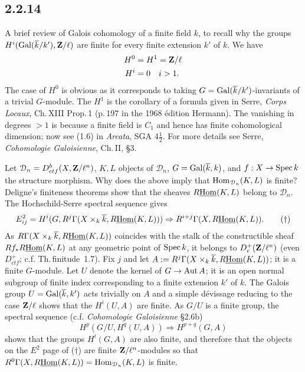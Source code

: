 \documentclass[deligne.tex]{subfiles}
\begin{document}
	\subsection*{2.2.14} A brief review of Galois cohomology of a finite
	field $k$, to recall why the groups $H^i(\operatorname{Gal}(\overline k/k'),\mathbf{Z}/\ell)$
	are finite for every finite extension $k'$ of $k$. We have
	\begin{align*}
		H^0&=H^1=\mathbf{Z}/\ell \\
		H^i&=0\quad i>1.
	\end{align*}
	The case of $H^0$ is obvious as it corresponds to taking
	$G=\operatorname{Gal}(\overline k/k')$-invariants of a trivial
	$G$-module. The $H^1$ is the corollary of a formula given in Serre,
	\emph{Corps Locaux}, Ch.\,XIII Prop.\,1 (p.\,197 in the 1968 édition Hermann).
	The vanishing in
	degrees $>1$ is because a finite field is $C_1$ and hence has finite
	cohomological dimension; now see (1.6) in
	\emph{Arcata}, SGA 4$\frac12$. For more details see Serre,
	\emph{Cohomologie Galoisienne}, Ch.\,II, \S3.
	
	Let $\mathcal D_n= D_{ctf}^b(X,\mathbf{Z}/\ell^n)$,
	$K,L$ objects of $\mathcal D_n$, $G=\operatorname{Gal}(\overline k,k)$,
	and $f:X\rightarrow\operatorname{Spec} k$ the structure morphism.
	Why does the above imply that $\operatorname{Hom}_{\mathcal D_n}(K,L)$ is finite?
	Deligne's finiteness theorems show that the sheaves
	$R\underline{\operatorname{Hom}}(K,L)$ belong to $\mathcal D_n$.
	The Hochschild-Serre spectral sequence gives
	\begin{equation*}
		E^2_{ij}=H^i(G,R^j\Gamma(X\times_k\overline k,R\underline{\operatorname{Hom}}(K,L)))\Rightarrow R^{i+j}\Gamma(X,R\underline{\operatorname{Hom}}(K,L)).\tag{$\dagger$}
	\end{equation*}
	As $R\Gamma(X\times_k\overline k,R\underline{\operatorname{Hom}}(K,L))$ coincides with
	the stalk of the constructible sheaf $Rf_*R\underline{\operatorname{Hom}}(K,L)$
	at any geometric point of $\operatorname{Spec} k$, it belongs to $D^+_{c}(\mathbf{Z}/\ell^n)$
	(even $D^+_{ctf}$; c.f. Th.\,finitude~1.7).
	Fix $j$ and let
	$A:=R^j\Gamma(X\times_k\overline k,R\underline{\operatorname{Hom}}(K,L))$; it is a finite
	$G$-module. Let $U$ denote the kernel of $G\rightarrow\operatorname{Aut} A$; it is an open
	normal subgroup of finite index corresponding to a finite extension
	$k'$ of $k$. The Galois group $U=\operatorname{Gal}(\overline k,k')$ acts trivially
	on $A$ and a simple dévissage reducing to the case $\mathbf{Z}/\ell$ shows that
	the $H^i(U,A)$ are finite. As $G/U$ is a finite group, the spectral 
	sequence (c.f. \emph{Cohomologie Galoisienne} \S2.6b)
	\begin{equation*}
		H^p(G/U,H^q(U,A))\Rightarrow H^{p+q}(G,A)
	\end{equation*}
	shows that the groups $H^i(G,A)$ are also finite, and therefore that the
	objects on the $E^2$ page of ($\dagger$) are finite $\mathbf{Z}/\ell^n$-modules
	so that $R^0\Gamma(X,R\underline{\operatorname{Hom}}(K,L))=\operatorname{Hom}_{\mathcal D_n}(K,L)$ is finite.
\end{document}
